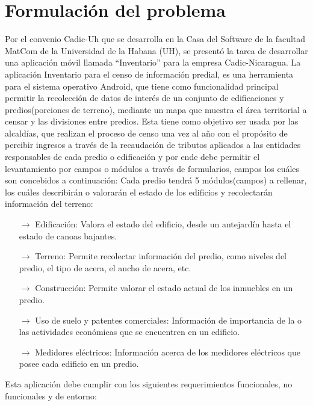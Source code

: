 \section{Formulación del problema}
Por el convenio Cadic-Uh que se desarrolla en la Casa del Software de la facultad
MatCom de la Universidad de la Habana (UH), se presentó la tarea de desarrollar
una aplicación móvil llamada “Inventario” para la empresa Cadic-Nicaragua.
La aplicación Inventario para el censo de información predial, es una herramienta
para el sistema operativo Android, que tiene como funcionalidad principal permitir la
recolección de datos de interés de un conjunto de edificaciones y predios(porciones
de terreno), mediante un mapa que muestra el área territorial a censar y las
divisiones entre predios. Esta tiene como objetivo ser usada por las alcaldías, que
realizan el proceso de censo una vez al año con el propósito de percibir ingresos a
través de la recaudación de tributos aplicados a las entidades responsables de cada
predio o edificación y por ende debe permitir el levantamiento por campos o
módulos a través de formularios, campos los cuáles son concebidos a continuación:
Cada predio tendrá 5 módulos(campos) a rellenar, los cuáles describirán o valorarán
el estado de los edificios y recolectarán información del terreno:
\begin{itemize}
      \item[$\rightarrow$] Edificación: Valora el estado del edificio, desde un antejardín hasta el
            estado de canoas bajantes.
      \item[$\rightarrow$] Terreno: Permite recolectar información del predio, como niveles del predio,
            el tipo de acera, el ancho de acera, etc.
      \item[$\rightarrow$] Construcción: Permite valorar el estado actual de los inmuebles en un
            predio.
      \item[$\rightarrow$] Uso de suelo y patentes comerciales: Información de importancia de la o
            las actividades económicas que se encuentren en un edificio.
      \item[$\rightarrow$] Medidores eléctricos: Información acerca de los medidores eléctricos que
            posee cada edificio en un predio.
\end{itemize}
Esta aplicación debe cumplir con los siguientes requerimientos funcionales, no
funcionales y de entorno:
